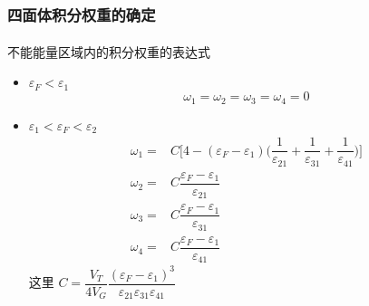 \documentclass[cjk,slidestop,compress,mathserif,blue]{beamer}
\newcommand{\upcite}[1]{\hspace{0ex}\textsuperscript{\cite{#1}}} %
\begin{document}
\frame
{
	\frametitle{四面体积分权重的确定}
	不能能量区域内的积分权重的表达式\upcite{PRB49-16233_1994}
	\begin{itemize}
	\item $\varepsilon_F<\varepsilon_1$
		\begin{displaymath}
			\omega_1=\omega_2=\omega_3=\omega_4=0
		\end{displaymath}
	\item $\varepsilon_1<\varepsilon_F<\varepsilon_2$
		\begin{displaymath}
			\begin{aligned}
				\omega_1=&C\bigg[4-(\varepsilon_F-\varepsilon_1)\bigg(\dfrac1{\varepsilon_{21}}+\dfrac1{\varepsilon_{31}}+\dfrac1{\varepsilon_{41}}\bigg)\bigg]\\
				\omega_2=&C\dfrac{\varepsilon_F-\varepsilon_1}{\varepsilon_{21}}\\
				\omega_3=&C\dfrac{\varepsilon_F-\varepsilon_1}{\varepsilon_{31}}\\
				\omega_4=&C\dfrac{\varepsilon_F-\varepsilon_1}{\varepsilon_{41}}
			\end{aligned}
		\end{displaymath}
		这里
			$C=\dfrac{V_T}{4V_G}\dfrac{(\varepsilon_F-\varepsilon_1)^3}{\varepsilon_{21}\varepsilon_{31}\varepsilon_{41}}$
	\end{itemize}
}
\end{document}
